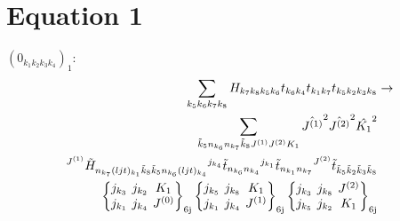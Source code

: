 \documentclass[11pt]{article}
\newcommand{\sixj}[6]{\begingroup\setlength{\arraycolsep}{0.2em}\begin{Bmatrix} #1 & #2 & #3 \\ #4 & #5 & #6 \end{Bmatrix}_{\text{6j}}\endgroup}
\begin{document}
\section{Equation 1}
$\left({0}_{{k}_{1}{k}_{2}{k}_{3}{k}_{4}}\right)_{1}$:
\begin{align}
\sum_{{k}_{5}{k}_{6}{k}_{7}{k}_{8}}{H}_{{k}_{7}{k}_{8}{k}_{5}{k}_{6}}{t}_{{k}_{6}{k}_{4}}{t}_{{k}_{1}{k}_{7}}{t}_{{k}_{5}{k}_{2}{k}_{3}{k}_{8}}&\rightarrow \notag \\\sum_{\tilde{k}_{5}n_{{k}_{6}}n_{{k}_{7}}\tilde{k}_{8}J^{(1)}J^{(2)}K_{1}}\hat{J^{(1)}}^{2}\hat{J^{(2)}}^{2}\hat{K_{1}}^{2}& \notag \\{}^{J^{(1)}}\tilde{H}_{n_{{k}_{7}}(ljt)_{{k}_{1}}\tilde{k}_{8}\tilde{k}_{5}n_{{k}_{6}}(ljt)_{{k}_{4}}}{}^{j_{{k}_{4}}}\tilde{t}_{n_{{k}_{6}}n_{{k}_{4}}}{}^{j_{{k}_{1}}}\tilde{t}_{n_{{k}_{1}}n_{{k}_{7}}}{}^{J^{(2)}}\tilde{t}_{\tilde{k}_{5}\tilde{k}_{2}\tilde{k}_{3}\tilde{k}_{8}}& \notag \\\sixj{j_{{k}_{3}}}{j_{{k}_{2}}}{K_{1}}{j_{{k}_{1}}}{j_{{k}_{4}}}{J^{(0)}}\sixj{j_{{k}_{5}}}{j_{{k}_{8}}}{K_{1}}{j_{{k}_{1}}}{j_{{k}_{4}}}{J^{(1)}}\sixj{j_{{k}_{3}}}{j_{{k}_{8}}}{J^{(2)}}{j_{{k}_{5}}}{j_{{k}_{2}}}{K_{1}}
\end{align}
\end{document}
